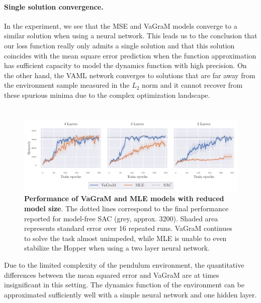 \paragraph{Single solution convergence.}
In the experiment, we see that the MSE and VaGraM models converge to a similar solution when using a neural network. 
This leads us to the conclusion that our loss function really only admits a single solution and that this solution coincides with the mean square error prediction when the function approximation has sufficient capacity to model the dynamics function with high precision.
On the other hand, the VAML network converges to solutions that are far away from the environment sample measured in the $L_2$ norm and it cannot recover from these spurious minima due to the complex optimization landscape.


\section{}

\begin{figure}[t]
\begin{center}
    \includegraphics[clip, trim=0.2cm 0.0cm 0.4cm 0.0cm, width=1.\linewidth]{figures/vagram/fig_2.pdf}
\end{center}
    \caption{\textbf{Performance of VaGraM and MLE models with reduced model size}. The dotted lines correspond to the final performance reported for model-free SAC (grey, approx. 3200). Shaded area represents standard error over 16 repeated runs. VaGraM continues to solve the task almost unimpeded, while MLE is unable to even stabilize the Hopper when using a two layer neural network.}
    \label{fig:vagram:pendulum_small}
\end{figure}
Due to the limited complexity of the pendulum environment, the quantitative differences between the mean squared error and VaGraM are at times insignificant in this setting.
The dynamics function of the environment can be approximated sufficiently well with a simple neural network and one hidden layer.

